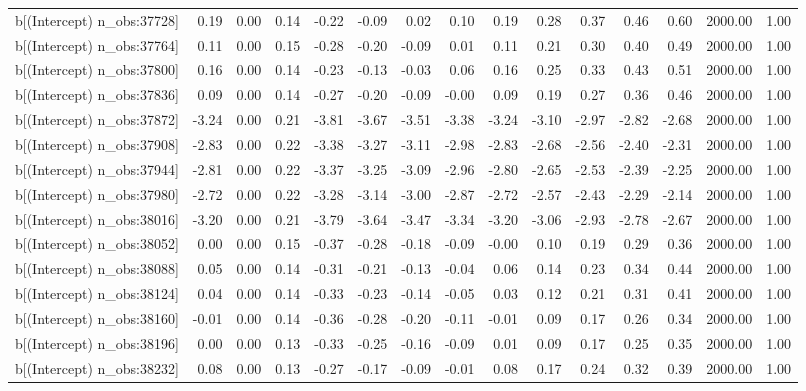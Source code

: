 \begin{table}[ht]
\begin{tabular}{rrrrrrrrrrrrrrr}
  b[(Intercept) n\_obs:37728] & 0.19 & 0.00 & 0.14 & -0.22 & -0.09 & 0.02 & 0.10 & 0.19 & 0.28 & 0.37 & 0.46 & 0.60 & 2000.00 & 1.00 \\ 
  b[(Intercept) n\_obs:37764] & 0.11 & 0.00 & 0.15 & -0.28 & -0.20 & -0.09 & 0.01 & 0.11 & 0.21 & 0.30 & 0.40 & 0.49 & 2000.00 & 1.00 \\ 
  b[(Intercept) n\_obs:37800] & 0.16 & 0.00 & 0.14 & -0.23 & -0.13 & -0.03 & 0.06 & 0.16 & 0.25 & 0.33 & 0.43 & 0.51 & 2000.00 & 1.00 \\ 
  b[(Intercept) n\_obs:37836] & 0.09 & 0.00 & 0.14 & -0.27 & -0.20 & -0.09 & -0.00 & 0.09 & 0.19 & 0.27 & 0.36 & 0.46 & 2000.00 & 1.00 \\ 
  b[(Intercept) n\_obs:37872] & -3.24 & 0.00 & 0.21 & -3.81 & -3.67 & -3.51 & -3.38 & -3.24 & -3.10 & -2.97 & -2.82 & -2.68 & 2000.00 & 1.00 \\ 
  b[(Intercept) n\_obs:37908] & -2.83 & 0.00 & 0.22 & -3.38 & -3.27 & -3.11 & -2.98 & -2.83 & -2.68 & -2.56 & -2.40 & -2.31 & 2000.00 & 1.00 \\ 
  b[(Intercept) n\_obs:37944] & -2.81 & 0.00 & 0.22 & -3.37 & -3.25 & -3.09 & -2.96 & -2.80 & -2.65 & -2.53 & -2.39 & -2.25 & 2000.00 & 1.00 \\ 
  b[(Intercept) n\_obs:37980] & -2.72 & 0.00 & 0.22 & -3.28 & -3.14 & -3.00 & -2.87 & -2.72 & -2.57 & -2.43 & -2.29 & -2.14 & 2000.00 & 1.00 \\ 
  b[(Intercept) n\_obs:38016] & -3.20 & 0.00 & 0.21 & -3.79 & -3.64 & -3.47 & -3.34 & -3.20 & -3.06 & -2.93 & -2.78 & -2.67 & 2000.00 & 1.00 \\ 
  b[(Intercept) n\_obs:38052] & 0.00 & 0.00 & 0.15 & -0.37 & -0.28 & -0.18 & -0.09 & -0.00 & 0.10 & 0.19 & 0.29 & 0.36 & 2000.00 & 1.00 \\ 
  b[(Intercept) n\_obs:38088] & 0.05 & 0.00 & 0.14 & -0.31 & -0.21 & -0.13 & -0.04 & 0.06 & 0.14 & 0.23 & 0.34 & 0.44 & 2000.00 & 1.00 \\ 
  b[(Intercept) n\_obs:38124] & 0.04 & 0.00 & 0.14 & -0.33 & -0.23 & -0.14 & -0.05 & 0.03 & 0.12 & 0.21 & 0.31 & 0.41 & 2000.00 & 1.00 \\ 
  b[(Intercept) n\_obs:38160] & -0.01 & 0.00 & 0.14 & -0.36 & -0.28 & -0.20 & -0.11 & -0.01 & 0.09 & 0.17 & 0.26 & 0.34 & 2000.00 & 1.00 \\ 
  b[(Intercept) n\_obs:38196] & 0.00 & 0.00 & 0.13 & -0.33 & -0.25 & -0.16 & -0.09 & 0.01 & 0.09 & 0.17 & 0.25 & 0.35 & 2000.00 & 1.00 \\ 
  b[(Intercept) n\_obs:38232] & 0.08 & 0.00 & 0.13 & -0.27 & -0.17 & -0.09 & -0.01 & 0.08 & 0.17 & 0.24 & 0.32 & 0.39 & 2000.00 & 1.00 \\ 

\end{tabular}
\end{table}
